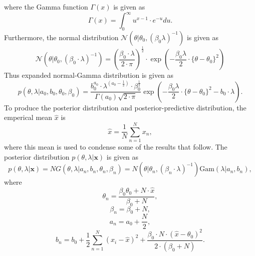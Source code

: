 \documentclass{article}
\begin{document}
where the Gamma function $\Gamma(x)$ is given as
\begin{equation}
\Gamma(x) = \int_{0}^{\infty} u^{x - 1} \cdot e^{-u} du.
\end{equation}
Furthermore, the normal distribution $\mathcal{N}\left( \theta \vert \theta_0, (\beta_0 \lambda)^{-1} \right)$ is given as
\begin{equation}
\mathcal{N}\left( \theta \vert \theta_0, (\beta_0 \cdot \lambda)^{-1} \right) = \left(\frac{\beta_0 \cdot \lambda}{2\cdot \pi}\right)^{\frac{1}{2}} \cdot \exp \left(  -\frac{\beta_0 \lambda}{2} \cdot \{ \theta - \theta_0 \}^2\right)
\end{equation}
Thus expanded normal-Gamma distribution is given as
\begin{equation}
p(\theta, \lambda \vert a_0, b_0, \theta_0, \beta_0) = \frac{b_0^{a_0} \cdot \lambda^{\left(a_0 - \frac{1}{2} \right)} \cdot \beta_0^{\frac{1}{2}} }{\Gamma(a_0) \sqrt{2 \cdot \pi}} \exp \left( -\frac{\beta_0 \lambda}{2} \cdot \{ \theta - \theta_0 \}^2 - b_0 \cdot \lambda \right).
\end{equation}
To produce the posterior distribution and posterior-predictive distribution, the emperical mean $\hat{x}$ is
\begin{equation}
\hat{x} = \frac{1}{N} \sum_{n=1}^{N} x_n,
\end{equation}
where this mean is used to condense some of the results that follow. The posterior distribution $p(\theta, \lambda \vert \mathbf{x})$ is given as
\begin{equation}
p(\theta, \lambda \vert \mathbf{x}) = NG(\theta, \lambda \vert a_n, b_n, \theta_n, \beta_n) = N(\theta \vert \theta_n, \left( \beta_n \cdot \lambda \right)^{-1}) \text{Gam}\left( \lambda \vert a_n, b_n \right),
\end{equation}
where
\begin{equation}\label{eq:theta_update}
\theta_n = \frac{\beta_0 \theta_0 + N \cdot \hat{x}}{\beta_0 + N},
\end{equation}
\begin{equation}\label{eq:beta_update}
\beta_n = \beta_0 + N,
\end{equation}
\begin{equation}\label{eq:a_update}
a_n = a_0 + \frac{N}{2},
\end{equation}
\begin{equation}\label{eq:b_update}
b_n = b_0 + \frac{1}{2}\sum_{n=1}^{N}(x_i - \hat{x})^2 + \frac{\beta_0 \cdot N \cdot (\hat{x} - \theta_0)^2}{2 \cdot (\beta_0 + N)}.
\end{equation}
\end{document}
